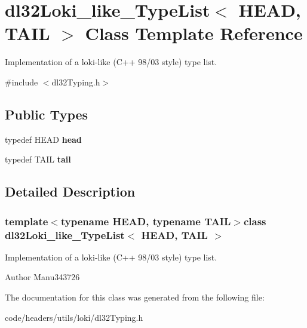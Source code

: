 \hypertarget{classdl32_loki__like___type_list}{\section{dl32\-Loki\-\_\-like\-\_\-\-Type\-List$<$ H\-E\-A\-D, T\-A\-I\-L $>$ Class Template Reference}
\label{classdl32_loki__like___type_list}
}


Implementation of a loki-\/like (C++ 98/03 style) type list.  




{\ttfamily \#include $<$dl32\-Typing.\-h$>$}

\subsection*{Public Types}
\begin{DoxyCompactItemize}
\item 
\hypertarget{classdl32_loki__like___type_list_a2696ec3dfa47f2efa33328681bf0c95f}{typedef H\-E\-A\-D {\bfseries head}}\label{classdl32_loki__like___type_list_a2696ec3dfa47f2efa33328681bf0c95f}

\item 
\hypertarget{classdl32_loki__like___type_list_a7d646c23b992941e1232d0092662aae7}{typedef T\-A\-I\-L {\bfseries tail}}\label{classdl32_loki__like___type_list_a7d646c23b992941e1232d0092662aae7}

\end{DoxyCompactItemize}


\subsection{Detailed Description}
\subsubsection*{template$<$typename H\-E\-A\-D, typename T\-A\-I\-L$>$class dl32\-Loki\-\_\-like\-\_\-\-Type\-List$<$ H\-E\-A\-D, T\-A\-I\-L $>$}

Implementation of a loki-\/like (C++ 98/03 style) type list. 

\begin{DoxyAuthor}{Author}
Manu343726 
\end{DoxyAuthor}


The documentation for this class was generated from the following file\-:\begin{DoxyCompactItemize}
\item 
code/headers/utils/loki/dl32\-Typing.\-h\end{DoxyCompactItemize}
